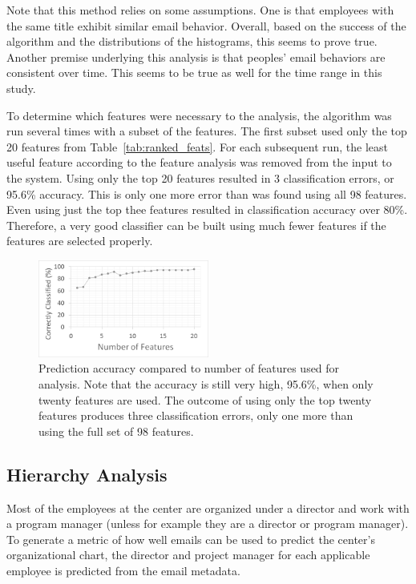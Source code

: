 \documentclass{article}
\begin{document}
Note that this method relies on some assumptions.  One is that employees with the same title exhibit similar email behavior.  Overall, based on the success of the algorithm and the distributions of the histograms, this seems to prove true.  Another premise underlying this analysis is that peoples' email behaviors are consistent over time.  This seems to be true as well for the time range in this study.

To determine which features were necessary to the analysis, the algorithm was run several times with a subset of the features.  The first subset used only the top 20 features from Table~\ref{tab:ranked_feats}.  For each subsequent run, the least useful feature according to the feature analysis was removed from the input to the system.  Using only the top 20 features resulted in 3 classification errors, or 95.6\% accuracy.  This is only one more error than was found using all 98 features.  Even using just the top thee features resulted in classification accuracy over 80\%.  Therefore, a very good classifier can be built using much fewer features if the features are selected properly.
\begin{figure}[H]
    \centering
        \includegraphics[width=0.5\textwidth]{FeatureAnalysis}
        \caption{Prediction accuracy compared to number of features used for analysis.  Note that the accuracy is still very high, 95.6\%, when only twenty features are used.  The outcome of using only the top twenty features produces three classification errors, only one more than using the full set of 98 features. }
        \label{fig:feat_analysis}
\end{figure}

\subsection{Hierarchy Analysis}
Most of the employees at the center are organized under a director and work with a program manager (unless for example they are a director or program manager).  To generate a metric of how well emails can be used to predict the center's organizational chart, the director and project manager for each applicable employee is predicted from the email metadata. 
\end{document}

